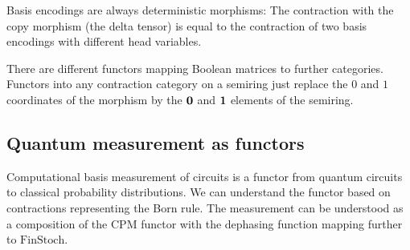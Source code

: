 \documentclass[aps,onecolumn,nofootinbib,pra]{article}
\begin{document}
    Basis encodings are always deterministic morphisms: The contraction with the copy morphism (the delta tensor) is equal to the contraction of two basis encodings with different head variables.

    There are different functors mapping Boolean matrices to further categories.
    Functors into any contraction category on a semiring just replace the $0$ and $1$ coordinates of the morphism by the $\mathbf{0}$ and $\mathbf{1}$ elements of the semiring.


    \subsection{Quantum measurement as functors}

    Computational basis measurement of circuits is a functor from quantum circuits to classical probability distributions.
    We can understand the functor based on contractions representing the Born rule.
    The measurement can be understood as a composition of the $\mathrm{CPM}$ functor with the dephasing function mapping further to $\mathrm{FinStoch}$.

    
    
\end{document}
